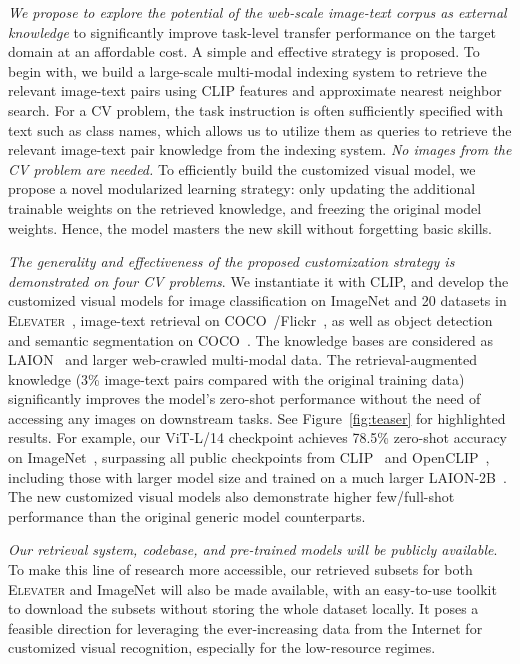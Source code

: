 \documentclass[10pt,twocolumn,letterpaper]{article}
\begin{document}
{\it We propose to explore the potential of the web-scale image-text corpus as external knowledge} to significantly improve task-level transfer performance on the target domain at an affordable cost.
A simple and effective strategy is proposed. To begin with, we build a large-scale multi-modal indexing system to retrieve the relevant image-text pairs using CLIP features and approximate nearest neighbor search. For a CV problem, the task instruction is often sufficiently specified with text such as class names, which allows us to utilize them as queries to retrieve the relevant image-text pair knowledge from the indexing system. \emph{No images from the CV problem are needed.} To efficiently build the customized visual model, we propose a novel modularized learning strategy: only updating the additional trainable weights on the retrieved knowledge, and freezing the original model weights. Hence, the model masters the new skill without forgetting basic skills.

{\it The generality and effectiveness of the proposed customization strategy is demonstrated on four CV problems}.
We instantiate it with CLIP, and develop the customized visual models for image classification on ImageNet and 20 datasets in \textsc{Elevater}~\cite{li2022elevater}, image-text retrieval on COCO~\cite{lin2014microsoft}/Flickr~\cite{plummer2015flickr30k}, as well as object detection and semantic segmentation on COCO~\cite{lin2014microsoft}.
The knowledge bases are considered as LAION~\cite{schuhmann2021laion} and larger web-crawled multi-modal data. The retrieval-augmented knowledge (3\% image-text pairs compared with the original training data) significantly improves the model's zero-shot performance without the need of accessing any images on downstream tasks. See Figure~\ref{fig:teaser} for highlighted results.
For example, our ViT-L/14 checkpoint achieves 78.5\% zero-shot accuracy on ImageNet~\cite{deng2009imagenet}, surpassing all public checkpoints from CLIP~\cite{radford2021learning} and OpenCLIP~\cite{openclip}, including those with larger model size and trained on a much larger LAION-2B~\cite{schuhmann2022laion}. The new customized visual models also demonstrate higher few/full-shot performance than the original generic model counterparts. 

{\it Our retrieval system, codebase, and pre-trained models will be publicly available}.  To make this line of research more accessible, our retrieved subsets for both \textsc{Elevater} and ImageNet will also be made available, with an easy-to-use toolkit to download the subsets without storing the whole dataset locally.  It poses a feasible direction for leveraging the ever-increasing data from the Internet for customized visual recognition, especially for the low-resource regimes. 
 \vspace{-2mm}
\end{document}
